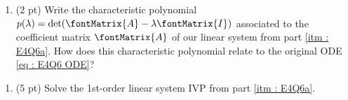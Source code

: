 \begin{enumerate}[resume,label=(\alph*)]
\item\label{itm : E4Q6b} (2 pt) Write the characteristic polynomial $p(\lambda) = \det(\fontMatrix{A} - \lambda \fontMatrix{I})$ associated to the coefficient matrix $\fontMatrix{A}$ of our linear system from part \ref{itm : E4Q6a}. How does this characteristic polynomial relate to the original ODE \eqref{eq : E4Q6 ODE}?
\end{enumerate}




\newpage



\begin{enumerate}[resume,label=(\alph*)]
\item\label{itm : E4Q6c} (5 pt) Solve the 1st-order linear system IVP from part \ref{itm : E4Q6a}. 
\end{enumerate}

